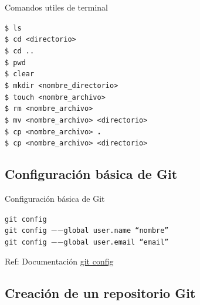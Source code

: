 \documentclass{beamer}
\begin{document}
\begin{frame}[containsverbatim]{Comandos utiles de terminal}

  \begin{block}{}
    \texttt{\$ ls \\
    \$ cd <directorio>  \\ 
    \$ cd .. \\ 
    \$ pwd \\
    \$ clear  \\ 
    \$ mkdir <nombre\_directorio> \\ 
    \$ touch <nombre\_archivo>\\ 
    \$ rm <nombre\_archivo> \\ 
    \$ mv <nombre\_archivo> <directorio> \\
    \$ cp <nombre\_archivo> \textbf{.} \\    
    \$ cp <nombre\_archivo> <directorio>} 
  \end{block}

\end{frame}




\subsection{ Configuración básica de Git}
  
  \begin{frame}[containsverbatim]{Configuración básica de Git} 
  
    \begin{block} {}
    {\texttt {git config }} \\ 
    {\texttt {git config $-$$-$global user.name ``nombre''}} \\ 
    {\texttt {git config $-$$-$global user.email ``email''  }}
    \end{block}

  Ref: Documentación \href{https://docs.github.com/es/get-started/getting-started-with-git/setting-your-username-in-gits}{git config }
  \end{frame}
 
\subsection {Creación de un repositorio Git}
  
\end{document}
